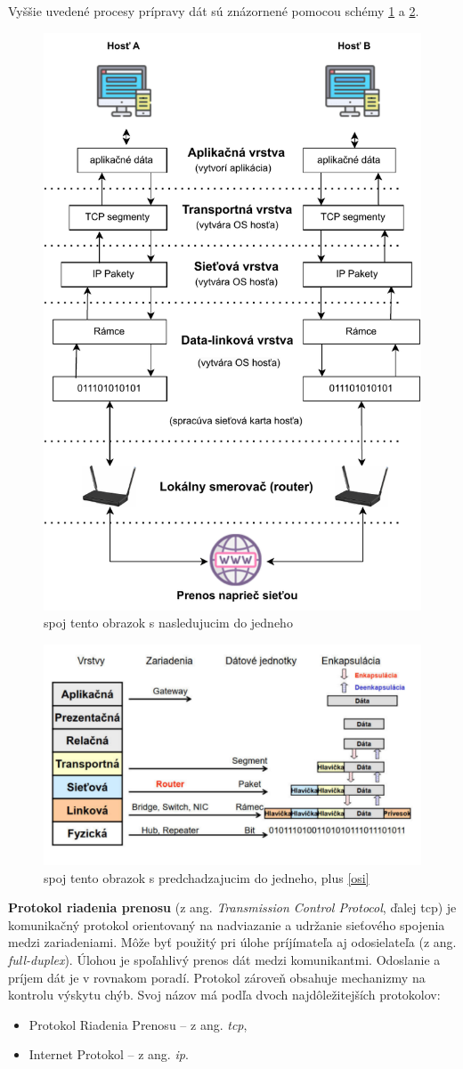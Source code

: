 Vyššie uvedené procesy prípravy dát sú znázornené pomocou schémy \ref{p1} a \ref{p2}.
\begin{figure}[!h]
	\centering
	\includegraphics[width=0.7\linewidth]{figures/prenos1z2}
	\caption{spoj tento obrazok s nasledujucim do jedneho}
	\label{p1}
\end{figure}
\begin{figure}
	\centering
	\includegraphics[width=0.7\linewidth]{figures/prenos2z2}
	\caption{spoj tento obrazok s predchadzajucim do jedneho, plus \ref{osi}}
	\label{p2}
\end{figure}
\newpage
\textbf{Protokol riadenia prenosu} (z ang. \textit{Transmission Control Protocol}, ďalej \acrshort{tcp}) je komunikačný protokol orientovaný na nadviazanie a udržanie sieťového spojenia medzi zariadeniami. Môže byť použitý pri úlohe príjímateľa aj odosielateľa (z ang. \textit{full-duplex}). Úlohou je spoľahlivý prenos dát medzi komunikantmi. Odoslanie a príjem dát je v rovnakom poradí. Protokol zároveň obsahuje mechanizmy na kontrolu výskytu chýb. Svoj názov má podľa dvoch najdôležitejších protokolov:
\begin{itemize}
	\item{Protokol Riadenia Prenosu} -- z ang. \textit{\acrlong{tcp}},
	\item{Internet Protokol} -- z ang. \textit{\acrlong{ip}}. 
\end{itemize}

